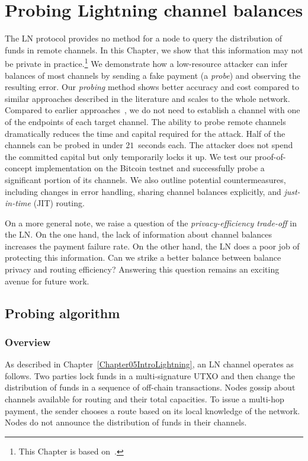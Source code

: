 \chapter{Probing Lightning channel balances}

\label{Chapter06LNprobing}

The LN protocol provides no method for a node to query the distribution of funds in remote channels.
In this Chapter, we show that this information may not be private in practice.\footnote{This Chapter is based on~\cite{Tikhomirov2020}.}
We demonstrate how a low-resource attacker can infer balances of most channels by sending a fake payment (a \textit{probe}) and observing the resulting error.
Our \textit{probing} method shows better accuracy and cost compared to similar approaches described in the literature and scales to the whole network.
Compared to earlier approaches~\cite{HerreraJoancomarti2019, Dam2019}, we do not need to establish a channel with one of the endpoints of each target channel.
The ability to probe remote channels dramatically reduces the time and capital required for the attack.
Half of the channels can be probed in under $21$~seconds each.
The attacker does not spend the committed capital but only temporarily locks it up.
We test our proof-of-concept implementation on the Bitcoin testnet and successfully probe a significant portion of its channels.
We also outline potential countermeasures, including changes in error handling, sharing channel balances explicitly, and \textit{just-in-time} (JIT) routing.

On a more general note, we raise a question of the \textit{privacy-efficiency trade-off} in the LN\@.
On the one hand, the lack of information about channel balances increases the payment failure rate.
On the other hand, the LN does a poor job of protecting this information.
Can we strike a better balance between balance privacy and routing efficiency?
Answering this question remains an exciting avenue for future work.


\section{Probing algorithm}
\label{sec:probing}

\subsection{Overview}

As described in Chapter~\ref{Chapter05IntroLightning}, an LN channel operates as follows.
Two parties lock funds in a multi-signature UTXO and then change the distribution of funds in a sequence of off-chain transactions.
Nodes gossip about channels available for routing and their total capacities.
To issue a multi-hop payment, the sender chooses a route based on its local knowledge of the network.
Nodes do not announce the distribution of funds in their channels.

